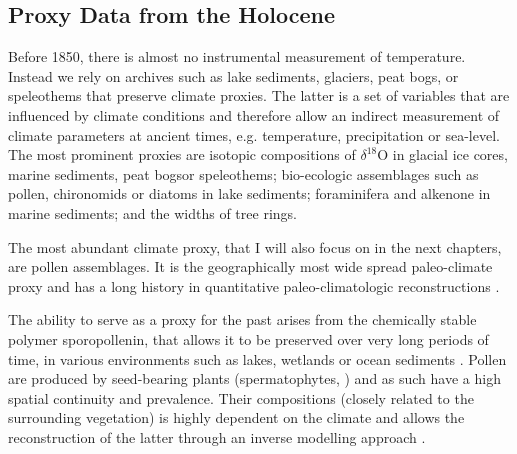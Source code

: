 \begin{refsection}
\subsection{Proxy Data from the Holocene}  \label{sec:intro-paleo-data}
Before 1850, there is almost no instrumental measurement of temperature. Instead we rely on archives such as lake sediments, glaciers, peat bogs, or speleothems that preserve climate proxies. The latter is a set of variables that are influenced by climate conditions and therefore allow an indirect measurement of climate parameters at ancient times, e.g. temperature, precipitation or sea-level. The most prominent proxies are isotopic compositions of $\delta^{18}$O in glacial ice cores\addref, marine sediments\addref, peat bogs\addref or speleothems\addref; bio-ecologic assemblages such as pollen\addref, chironomids \addref or diatoms \addref in lake sediments; foraminifera and alkenone in marine sediments\addref; and the widths of tree rings. 

The most abundant climate proxy, that I will also focus on in the next chapters, are pollen assemblages. It is the  geographically most wide spread paleo-climate proxy \citep{BirksBirks1980}  and has a long history in quantitative paleo-climatologic reconstructions \citep[e.g.][]{Nichols1967, Nichols1969, Bradley1985}. 

The ability to serve as a proxy for the past arises from the chemically stable polymer sporopollenin, that allows it to be preserved over very long periods of time, in various environments such as lakes, wetlands or ocean sediments  \citep{FaegriKalandKrzywinski1989, Havinga1967}. Pollen are produced by seed-bearing plants (spermatophytes, \cite{Wodehouse1935} ) and as such have a high spatial continuity and prevalence. Their compositions (closely related to the surrounding vegetation) is highly dependent on the climate and allows the reconstruction of the latter through an inverse modelling approach .


\end{refsection}
